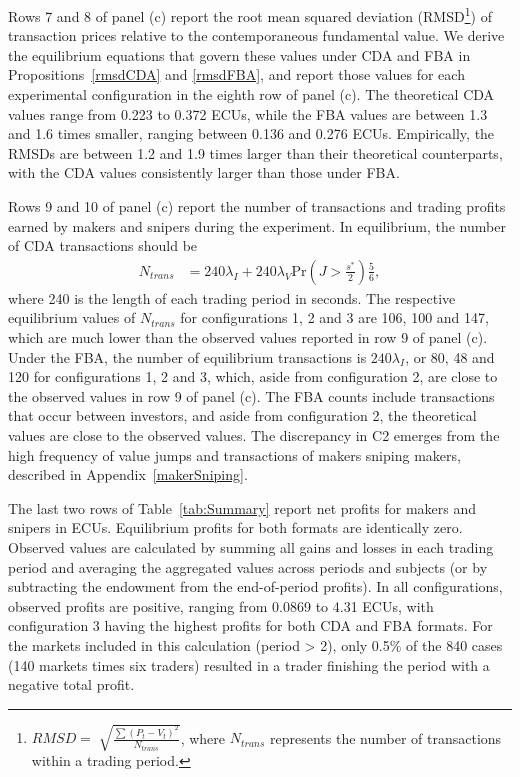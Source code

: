 \documentclass[12pt]{article}
\begin{document}
Rows 7 and 8 of panel (c) report the root mean squared deviation (RMSD\footnote{\label{footnoteRMSD} $RMSD = \sqrt[]{\frac{\sum(P_t-V_t)^2}{N_{trans}}}$, where $N_{trans}$ represents the number of transactions within a trading period.}) of transaction prices relative to the contemporaneous fundamental value. We derive the equilibrium equations that govern these values under CDA and FBA in Propositions~\ref{rmsdCDA} and \ref{rmsdFBA}, and report those values for each experimental configuration in the eighth row of panel (c). The theoretical CDA values range from 0.223 to 0.372 ECUs, while the FBA values are between 1.3 and 1.6 times smaller, ranging between 0.136 and 0.276 ECUs. Empirically, the RMSDs are between 1.2 and 1.9 times larger than their theoretical counterparts, with the CDA values consistently larger than those under FBA.

Rows 9 and 10 of panel (c) report the number of transactions and trading profits earned by makers and snipers during the experiment. In equilibrium, the number of CDA transactions should be
\begin{align}
\label{eq:CDA_trans}
N_{trans} & = 240 \lambda_I +  240 \lambda_V \textrm{Pr}\left(J > \frac{s^*}{2}\right) \frac{5}{6},
\end{align}
where 240 is the length of each trading period in seconds. The respective equilibrium values of $N_{trans}$ for configurations 1, 2 and 3 are 106, 100 and 147, which are much lower than the observed values reported in row 9 of panel (c). Under the FBA, the number of equilibrium transactions is $240 \lambda_I $, or 80, 48 and 120 for configurations 1, 2 and 3, which, aside from configuration 2, are close to the observed values in row 9 of panel (c). The FBA counts include transactions that occur between investors, and aside from configuration 2, the theoretical values are close to the observed values. 
The discrepancy in C2 emerges from the high frequency of value jumps and  transactions of makers sniping makers, described in Appendix~\ref{makerSniping}.

The last two rows of Table~\ref{tab:Summary} report net profits for makers and snipers in ECUs. Equilibrium profits for both formats are identically zero. Observed values are calculated by summing all gains and losses in each trading period and averaging the aggregated values across periods and subjects (or by subtracting the endowment from the end-of-period profits).  In all configurations, observed profits are positive, ranging from 0.0869 to 4.31 ECUs, with configuration 3 having the highest profits for both CDA and FBA formats. 
For the markets included in this calculation (period > 2), only 0.5\% of the 840 cases (140 markets times six traders) resulted in a trader finishing the period with a negative total profit.
\end{document}
